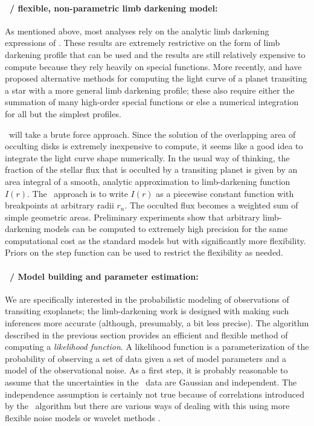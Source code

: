 \documentclass[letterpaper,12pt,preprint]{hack_aastex}
\newcommand{\Untrendy}{\package{Untrendy}}
\newcommand{\Bart}{\package{Bart}}
\begin{document}
\paragraph{\Bart\ / flexible, non-parametric limb darkening model:}
As mentioned above, most analyses rely on the
analytic limb darkening expressions of \citet{mandel}.
These results are extremely restrictive on the form of limb darkening profile
that can be used and the results are still relatively expensive to compute
because they rely heavily on special functions.
More recently, \citet{crazyass1} and \citet{crazyass2} have proposed
alternative methods for computing the light curve of a planet transiting a
star with a more general limb darkening profile; these also require
either the summation of many
high-order special functions or else a numerical integration for
all but the simplest profiles.

\Bart\ will take a brute force approach.
Since the solution of the overlapping area of occulting disks is extremely
inexpensive to compute, it seems like a good idea to integrate the light curve
shape numerically.
In the usual way of thinking, the fraction of the stellar flux
that is occulted by a transiting planet is given by an
area integral of a smooth, analytic approximation to limb-darkening function $I(r)$.
The \Bart\ approach is to write $I(r)$ as a piecewise constant function
with breakpoints at arbitrary radii $r_n$.  The occulted flux becomes a
weighted sum of simple geometric areas.
Preliminary experiments show that arbitrary limb-darkening models can be computed to
extremely high precision for the same computational cost as the standard
\citet{mandel} models but with significantly more flexibility.
Priors on the step function can be used to restrict the flexibility as needed.

\paragraph{\Bart\ / Model building and parameter estimation:}
We are specifically interested in the probabilistic modeling
of observations of transiting exoplanets; the limb-darkening work is designed with making such inferences more accurate (although, presumably, a bit less precise).
The algorithm described in the previous section provides an efficient and
flexible method of computing a \textit{likelihood function}.
A likelihood function is a parameterization of the probability of observing a
set of data given a set of model parameters and a model of the observational
noise.
As a first step, it is probably reasonable to assume that the uncertainties in
the \Kepler\ data are Gaussian and independent.
The independence assumption is certainly not true because of correlations
introduced by the \Untrendy\ algorithm but there are various ways of dealing
with this using more flexible noise models or wavelet methods \citep{wavelet}.
\end{document}
